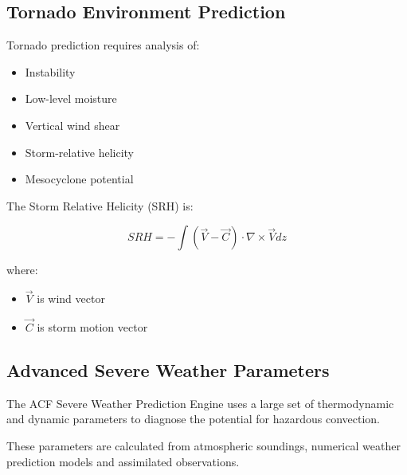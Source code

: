 \subsection{Tornado Environment Prediction}

Tornado prediction requires analysis of:

\begin{itemize}

\item Instability

\item Low-level moisture

\item Vertical wind shear

\item Storm-relative helicity

\item Mesocyclone potential

\end{itemize}


The Storm Relative Helicity (SRH) is:

\[
SRH =
-\int
(\vec{V}-\vec{C})
\cdot
\nabla\times\vec{V}
dz
\]

where:

\begin{itemize}

\item $\vec{V}$ is wind vector

\item $\vec{C}$ is storm motion vector

\end{itemize}

\subsection{Advanced Severe Weather Parameters}

The ACF Severe Weather Prediction Engine uses a large set of
thermodynamic and dynamic parameters to diagnose the potential for
hazardous convection.

These parameters are calculated from atmospheric soundings, numerical
weather prediction models and assimilated observations.


